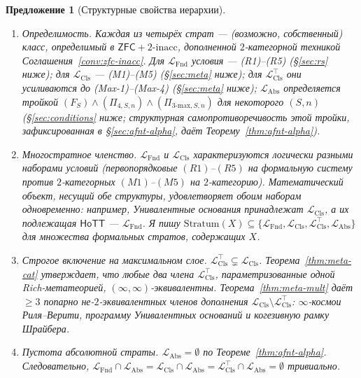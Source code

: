 \documentclass[11pt]{article}
\theoremstyle{plain}
\newtheorem{proposition}[theorem]{Предложение}
\theoremstyle{definition}
\newcommand{\LFnd}{\mathcal{L}_{\mathrm{Fnd}}}
\newcommand{\LCls}{\mathcal{L}_{\mathrm{Cls}}}
\newcommand{\LClsMax}{\mathcal{L}_{\mathrm{Cls}}^{\top}}
\newcommand{\LAbs}{\mathcal{L}_{\mathrm{Abs}}}
\newcommand{\ZFC}{\mathsf{ZFC}}
\newcommand{\HoTT}{\mathsf{HoTT}}
\begin{document}
\begin{proposition}[Структурные свойства иерархии]\label{prop:level-structure}
\begin{enumerate}
\item[\textbf{(i)}] \emph{Определимость.} Каждая из четырёх страт — (возможно, собственный) класс, определимый в $\ZFC + 2\text{-inacc}$, дополненной $2$-категорной техникой Соглашения~\ref{conv:zfc-inacc}. Для $\LFnd$ условия — (R1)--(R5) (\S\ref{sec:rs} ниже); для $\LCls$ — (M1)--(M5) (\S\ref{sec:meta} ниже); для $\LClsMax$ они усиливаются до (Max-1)--(Max-4) (\S\ref{sec:meta} ниже); $\LAbs$ определяется тройкой $(F_S) \wedge (\Pi_{4, S, n}) \wedge (\Pi_{3\text{-max}, S, n})$ для некоторого $(S, n)$ (\S\ref{sec:conditions} ниже; структурная самопротиворечивость этой тройки, зафиксированная в \S\ref{sec:afnt-alpha}, даёт Теорему~\ref{thm:afnt-alpha}).
\item[\textbf{(ii)}] \emph{Многостратное членство.} $\LFnd$ и $\LCls$ характеризуются логически разными наборами условий (первопорядковые $(R1)$--$(R5)$ на формальную систему против $2$-категорных $(M1)$--$(M5)$ на $2$-категорию). Математический объект, несущий обе структуры, удовлетворяет обоим наборам одновременно: например, Унивалентные основания принадлежат $\LCls$, а их подлежащая $\HoTT$ — $\LFnd$. Я пишу $\mathrm{Stratum}(X) \subseteq \{\LFnd, \LCls, \LClsMax, \LAbs\}$ для множества формальных стратов, содержащих $X$.
\item[\textbf{(iii)}] \emph{Строгое включение на максимальном слое.} $\LClsMax \subsetneq \LCls$. Теорема~\ref{thm:meta-cat} утверждает, что любые два члена $\LClsMax$, параметризованные одной Rich-метатеорией, $(\infty, \infty)$-эквивалентны. Теорема~\ref{thm:meta-mult} даёт $\geq 3$ попарно не-$2$-эквивалентных членов дополнения $\LCls \setminus \LClsMax$: $\infty$-космои Риля--Верити, программу Унивалентных оснований и когезивную рамку Шрайбера.
\item[\textbf{(iv)}] \emph{Пустота абсолютной страты.} $\LAbs = \emptyset$ по Теореме~\ref{thm:afnt-alpha}. Следовательно, $\LFnd \cap \LAbs = \LCls \cap \LAbs = \LClsMax \cap \LAbs = \emptyset$ тривиально.
\end{enumerate}
\end{proposition}
\end{document}
